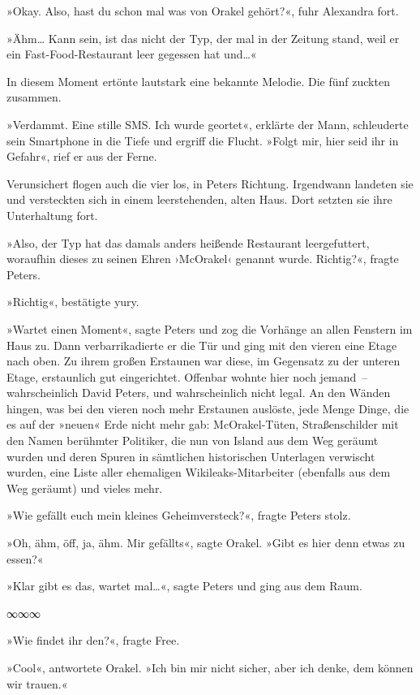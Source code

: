 »Okay. Also, hast du schon mal was von Orakel gehört?«, fuhr Alexandra fort.

»Ähm… Kann sein, ist das nicht der Typ, der mal in der Zeitung stand, weil er ein Fast-Food-Restaurant leer gegessen hat und…«

In diesem Moment ertönte lautstark eine bekannte Melodie. Die fünf zuckten zusammen.

»Verdammt. Eine stille SMS. Ich wurde geortet«, erklärte der Mann, schleuderte sein Smartphone in die Tiefe und ergriff die Flucht. »Folgt mir, hier seid ihr in Gefahr«, rief er aus der Ferne.

Verunsichert flogen auch die vier los, in Peters Richtung. Irgendwann landeten sie und versteckten sich in einem leerstehenden, alten Haus. Dort setzten sie ihre Unterhaltung fort.

»Also, der Typ hat das damals anders heißende Restaurant leergefuttert, woraufhin dieses zu seinen Ehren ›McOrakel‹ genannt wurde. Richtig?«, fragte Peters.

»Richtig«, bestätigte yury.

»Wartet einen Moment«, sagte Peters und zog die Vorhänge an allen Fenstern im Haus zu. Dann verbarrikadierte er die Tür und ging mit den vieren eine Etage nach oben. Zu ihrem großen Erstaunen war diese, im Gegensatz zu der unteren Etage, erstaunlich gut eingerichtet. Offenbar wohnte hier noch jemand~– wahrscheinlich David Peters, und wahrscheinlich nicht legal. An den Wänden hingen, was bei den vieren noch mehr Erstaunen auslöste, jede Menge Dinge, die es auf der »neuen« Erde nicht mehr gab: McOrakel-Tüten, Straßenschilder mit den Namen berühmter Politiker, die nun von Island aus dem Weg geräumt wurden und deren Spuren in sämtlichen historischen Unterlagen verwischt wurden, eine Liste aller ehemaligen Wikileaks-Mitarbeiter (ebenfalls aus dem Weg geräumt) und vieles mehr.

»Wie gefällt euch mein kleines Geheimversteck?«, fragte Peters stolz.

»Oh, ähm, öff, ja, ähm. Mir gefällts«, sagte Orakel. »Gibt es hier denn etwas zu essen?«

»Klar gibt es das, wartet mal…«, sagte Peters und ging aus dem Raum.

\begin{center}
    ∞∞∞
\end{center}

»Wie findet ihr den?«, fragte Free.

»Cool«, antwortete Orakel. »Ich bin mir nicht sicher, aber ich denke, dem können wir trauen.«

